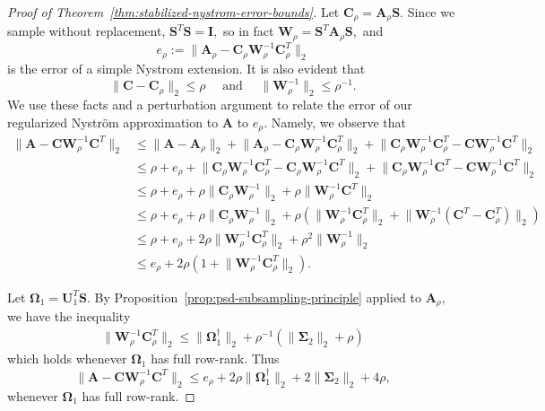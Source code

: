 \documentclass[11pt,letterpaper,twoside,reqno,nosumlimits]{amsart}
\def\pinv{\dagger}
\def\transp{T}
\newcommand{\mat}[1]{\ensuremath{\mathbf{#1}}}
\newcommand{\snorm}[1]{\ensuremath{\big\|#1\big\|_2}}
\theoremstyle{remark}
\begin{document}
\begin{proof}[Proof of Theorem~\ref{thm:stabilized-nystrom-error-bounds}]
 Let $\mat{C}_\rho = \mat{A}_\rho \mat{S}.$ Since we sample without replacement, $\mat{S}^\transp \mat{S} = \mat{I},$ so in fact $\mat{W}_\rho = \mat{S}^\transp\mat{A}_\rho\mat{S},$ and
\[
 e_\rho := \snorm{\mat{A}_\rho - \mat{C}_\rho \mat{W}_\rho^{-1} \mat{C}_\rho^\transp}
\]
is the error of a simple Nystrom extension. It is also evident that 
\[ \snorm{\mat{C} - \mat{C}_\rho} \leq \rho \quad \text{ and } \quad \snorm{\mat{W}_\rho^{-1}} \leq \rho^{-1}. 
\]
We use these facts and a perturbation argument to relate the error of our regularized Nystr\"om approximation to $\mat{A}$ to $e_\rho.$ Namely, we observe that	
\[
\begin{aligned}
\snorm{\mat{A} - \mat{C}\mat{W}_\rho^{-1} \mat{C}^\transp } & \leq \snorm{\mat{A} - \mat{A}_\rho} + \snorm{\mat{A}_\rho - \mat{C}_\rho \mat{W}_\rho^{-1} \mat{C}_\rho^\transp} + \snorm{\mat{C}_\rho \mat{W}_\rho^{-1} \mat{C}_\rho^\transp - \mat{C} \mat{W}_\rho^{-1} \mat{C}^\transp} \\
& \leq \rho + e_\rho + \snorm{\mat{C}_\rho \mat{W}_\rho^{-1} \mat{C}_\rho^\transp - \mat{C}_\rho \mat{W}_\rho^{-1} \mat{C}^\transp} + \snorm{\mat{C}_\rho \mat{W}_\rho^{-1} \mat{C}^\transp - \mat{C} \mat{W}_\rho^{-1} \mat{C}^\transp} \\
& \leq \rho + e_\rho + \rho \snorm{\mat{C}_\rho \mat{W}_\rho^{-1}} + \rho \snorm{\mat{W}_\rho^{-1} \mat{C}^\transp} \\
& \leq \rho + e_\rho + \rho \snorm{\mat{C}_\rho \mat{W}_\rho^{-1}} + \rho ( \snorm{\mat{W}_\rho^{-1} \mat{C}_\rho^\transp} + \snorm{\mat{W}_\rho^{-1} (\mat{C}^\transp - \mat{C}_\rho^\transp)}) \\
& \leq \rho + e_\rho + 2 \rho\snorm{\mat{W}_\rho^{-1} \mat{C}_\rho^\transp} + \rho^2 \snorm{\mat{W}_\rho^{-1}} \\
& \leq e_\rho + 2 \rho (1 + \snorm{\mat{W}_\rho^{-1} \mat{C}_\rho^\transp}).
\end{aligned}
\]

 Let $\mat{\Omega}_1 = \mat{U}_1^\transp \mat{S}.$ By Proposition~\ref{prop:psd-subsampling-principle} applied to $\mat{A}_\rho,$ we have the inequality
\[
\begin{aligned}
 \snorm{\mat{W}_\rho^{-1} \mat{C}_\rho^\transp} \leq \snorm{\mat{\Omega}_1^\pinv} + \rho^{-1} (\snorm{\mat{\Sigma}_2} + \rho)
\end{aligned}
\]
which holds whenever $\mat{\Omega}_1$ has full row-rank. Thus 
\begin{equation}
 \label{eqn:perturbation-bound}
\snorm{\mat{A} - \mat{C}\mat{W}_\rho^{-1} \mat{C}^\transp } \leq e_\rho + 2\rho \snorm{\mat{\Omega}_1^\pinv}  + 2 \snorm{\mat{\Sigma}_2} + 4\rho,
 \end{equation}
whenever $\mat{\Omega}_1$ has full row-rank.


\end{proof}
\end{document}
